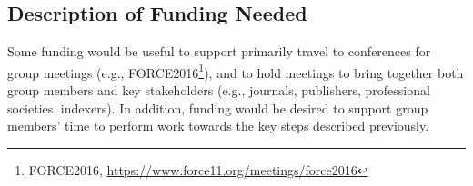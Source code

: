 \subsection{Description of Funding Needed}

Some funding would be useful to support primarily travel to conferences for
group meetings (e.g., FORCE2016\footnote{FORCE2016,
\url{https://www.force11.org/meetings/force2016}}), and to hold meetings to
bring together both group members and key stakeholders (e.g., journals,
publishers, professional societies, indexers). In addition, funding would be
desired to support group members' time to perform work towards the key steps
described previously.
